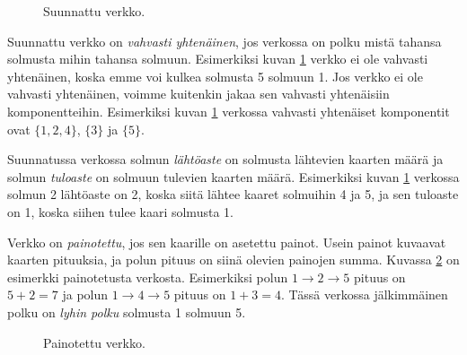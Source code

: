 \begin{figure}
\center
\begin{center}
\end{center}
\caption{Suunnattu verkko.}
\label{fig:versuu}
\end{figure}

Suunnattu verkko on \emph{vahvasti yhtenäinen},
jos verkossa on polku mistä tahansa solmusta
mihin tahansa solmuun.
Esimerkiksi kuvan \ref{fig:versuu} verkko ei
ole vahvasti yhtenäinen,
koska emme voi kulkea solmusta 5 solmuun 1.
Jos verkko ei ole vahvasti yhtenäinen,
voimme kuitenkin jakaa sen vahvasti yhtenäisiin komponentteihin.
Esimerkiksi kuvan \ref{fig:versuu} verkossa
vahvasti yhtenäiset komponentit ovat $\{1,2,4\}$, $\{3\}$ ja $\{5\}$.

Suunnatussa verkossa solmun \emph{lähtöaste} on
solmusta lähtevien kaarten määrä ja solmun \emph{tuloaste}
on solmuun tulevien kaarten määrä.
Esimerkiksi kuvan \ref{fig:versuu} verkossa
solmun 2 lähtöaste on 2, koska siitä lähtee kaaret solmuihin 4 ja 5,
ja sen tuloaste on 1, koska siihen tulee kaari solmusta 1.

Verkko on \emph{painotettu}, jos sen kaarille on asetettu painot.
Usein painot kuvaavat kaarten pituuksia, ja polun pituus
on siinä olevien painojen summa.
Kuvassa \ref{fig:verpai} on esimerkki painotetusta verkosta.
Esimerkiksi polun $1 \rightarrow 2 \rightarrow 5$ pituus on $5+2=7$
ja polun $1 \rightarrow 4 \rightarrow 5$ pituus on $1+3=4$.
Tässä verkossa jälkimmäinen polku on \emph{lyhin polku} solmusta 1 solmuun 5.

\begin{figure}
\center
\begin{center}
\end{center}
\caption{Painotettu verkko.}
\label{fig:verpai}
\end{figure}

